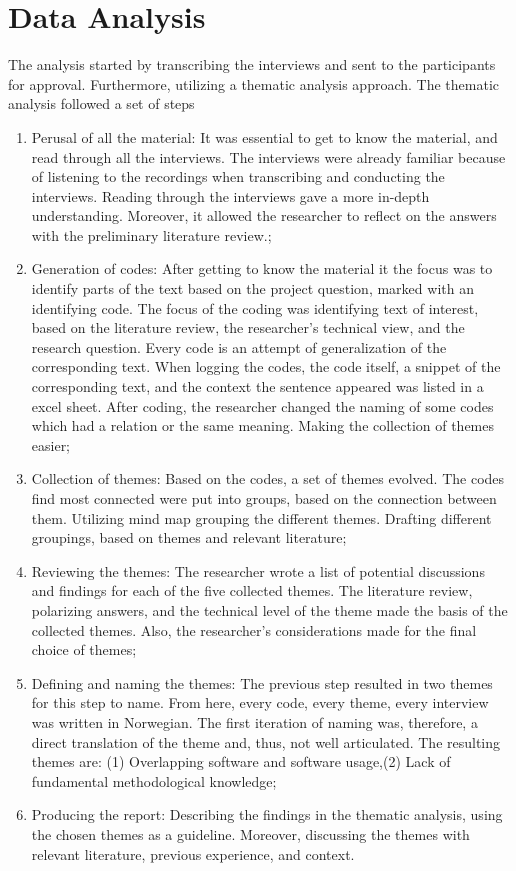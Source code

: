 \section{Data Analysis}
The analysis started by transcribing the interviews and sent to the participants for approval. Furthermore, utilizing a thematic analysis approach. The thematic analysis followed a set of steps

\begin{enumerate}
    \item Perusal of all the material: It was essential to get to know the material, and read through all the interviews. The interviews were already familiar because of listening to the recordings when transcribing and conducting the interviews. Reading through the interviews gave a more in-depth understanding. Moreover, it allowed the researcher to reflect on the answers with the preliminary literature review.; 
    \item Generation of codes: After getting to know the material it the focus was to identify parts of the text based on the project question, marked with an identifying code. The focus of the coding was identifying text of interest, based on the literature review, the researcher's technical view, and the research question. Every code is an attempt of generalization of the corresponding text. When logging the codes, the code itself, a snippet of the corresponding text, and the context the sentence appeared was listed in a excel sheet. After coding, the researcher changed the naming of some codes which had a relation or the same meaning. Making the collection of themes easier; 
    \item Collection of themes: Based on the codes, a set of themes evolved. The codes find most connected were put into groups, based on the connection between them. Utilizing mind map grouping the different themes. Drafting different groupings, based on themes and relevant literature; 
    \item  Reviewing the themes: The researcher wrote a list of potential discussions and findings for each of the five collected themes. The literature review, polarizing answers, and the technical level of the theme made the basis of the collected themes. Also, the researcher's considerations made for the final choice of themes; 
    \item Defining and naming the themes: The previous step resulted in two themes for this step to name. From here, every code, every theme, every interview was written in Norwegian. The first iteration of naming was, therefore, a direct translation of the theme and, thus, not well articulated. The resulting themes are: (1) Overlapping software and software usage,(2) Lack of fundamental methodological knowledge;
    \item Producing the report: Describing the findings in the thematic analysis, using the chosen themes as a guideline. Moreover, discussing the themes with relevant literature, previous experience, and context.
\end{enumerate}

